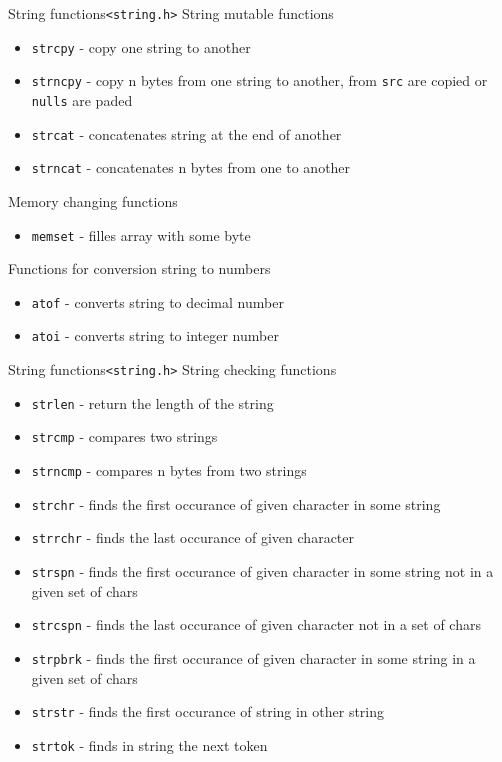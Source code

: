 

\begin{frame}{String functions}{\texttt{<string.h>}}
String mutable functions
\begin{itemize}
  \item \texttt{strcpy} - copy one string to another
  \item \texttt{strncpy} - copy n bytes from one string to another, from
  \texttt{src} are copied or \texttt{nulls} are paded
  \item \texttt{strcat} - concatenates string at the end of another
  \item \texttt{strncat} - concatenates n bytes from one to another
\end{itemize}
Memory changing functions
\begin{itemize}
  \item \texttt{memset} - filles array with some byte
\end{itemize}
Functions for conversion string to numbers
\begin{itemize}
  \item \texttt{atof} - converts string to decimal number
  \item \texttt{atoi} - converts string to integer number
\end{itemize}

\end{frame}

\begin{frame}[shrink=10]{String functions}{\texttt{<string.h>}}
String checking functions
\begin{itemize}
  \item \texttt{strlen} - return the length of the string
  \item \texttt{strcmp} - compares two strings
  \item \texttt{strncmp} - compares n bytes from two strings
  \item \texttt{strchr} - finds the first occurance of given character in some
  string
  \item \texttt{strrchr} - finds the last occurance of given character
  \item \texttt{strspn} - finds the first occurance of given character in some
  string not in a given set of chars
  \item \texttt{strcspn} - finds the last occurance of given character not in a
  set of chars
  \item \texttt{strpbrk} - finds the first occurance of given character in some
  string in a given set of chars
  \item \texttt{strstr} - finds the first occurance of string in other string
  \item \texttt{strtok} - finds in string the next token
\end{itemize} 
\end{frame}

